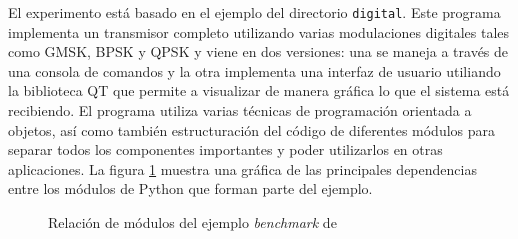 El experimento est\'a basado en el ejemplo del directorio \verb|digital|. Este programa implementa un
transmisor completo utilizando varias modulaciones digitales tales como GMSK, BPSK y QPSK y viene en dos
versiones: una se maneja a trav\'es de una consola de comandos y la otra implementa una interfaz de
usuario utiliando la biblioteca QT que permite a visualizar de manera gr\'afica lo que el sistema est\'a
recibiendo. El programa utiliza varias t\'ecnicas de programaci\'on orientada a objetos, as\'i como
tambi\'en estructuraci\'on del c\'odigo de diferentes m\'odulos para separar todos los componentes
importantes y poder utilizarlos en otras aplicaciones. La figura \ref{fig:relbench} muestra una gr\'afica
de las principales dependencias entre los m\'odulos de Python que forman parte del ejemplo.

\begin{figure}[htp]
\centering
{}
\vspace{0.5in}
\caption{Relaci\'on de m\'odulos del ejemplo \emph{benchmark} de \gnuradio}
\label{fig:relbench}
\end{figure}

